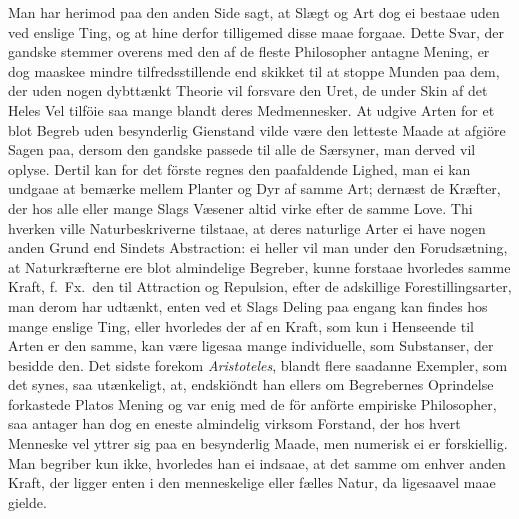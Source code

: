 \documentclass[12pt,a4paper]{article}
\newcommand{\opage}[1]{\marginnote{\footnotesize\textit{[#1]}}}
\begin{document}
Man har herimod paa den anden Side sagt, at Slægt og Art dog ei bestaae
uden ved enslige Ting, og at hine derfor tilligemed disse maae forgaae.
Dette Svar, der gandske stemmer overens med den af de fleste Philosopher
antagne Mening, er dog maaskee mindre tilfredsstillende end skikket til at
stoppe Munden paa dem, der uden nogen dybttænkt Theorie vil forsvare den
Uret, de under Skin af det Heles Vel tilföie saa mange blandt deres
Medmennesker. At udgive Arten for et blot Begreb uden besynderlig
Gienstand vilde være den letteste Maade at afgiöre Sagen paa, dersom den
gandske passede til alle de Særsyner, man derved vil oplyse. Dertil kan
for det förste regnes den paafaldende Lighed, man ei kan undgaae at
bemærke mellem Planter og Dyr af samme Art; dernæst de Kræfter, der hos
alle eller mange Slags Væsener altid virke efter de samme Love. Thi
hverken ville Naturbeskriverne tilstaae, at deres naturlige Arter ei have
nogen anden Grund end Sindets Abstraction: ei heller vil man under den
Forudsætning, at Naturkræfterne ere blot almindelige Begreber, kunne
forstaae hvorledes
\opage{228} samme Kraft, f.~Fx.\ den til Attraction og Repulsion, efter de adskillige
Forestillingsarter, man derom har udtænkt, enten ved et Slags Deling paa
engang kan findes hos mange enslige Ting, eller hvorledes der af en Kraft,
som kun i Henseende til Arten er den samme, kan være ligesaa mange
individuelle, som Substanser, der besidde den. Det sidste forekom
\emph{Aristoteles}, blandt flere saadanne Exempler, som det synes, saa
utænkeligt, at, endskiöndt han ellers om Begrebernes Oprindelse forkastede
Platos Mening og var enig med de för anförte empiriske Philosopher, saa
antager han dog en eneste almindelig virksom Forstand, der hos hvert
Menneske vel yttrer sig paa en besynderlig Maade, men numerisk ei er
forskiellig. Man begriber kun ikke, hvorledes han ei indsaae, at det
samme om enhver anden Kraft, der ligger enten i den menneskelige eller
fælles Natur, da ligesaavel maae gielde.
\end{document}
